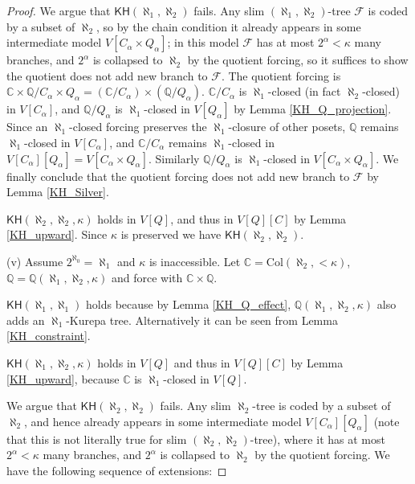 \documentclass[10pt,reqno]{amsart}
\theoremstyle{plain}
\theoremstyle{definition}
\theoremstyle{remark}
\begin{document}
\begin{proof}
We argue that $\mathsf{KH}(\aleph_1,\aleph_2)$ fails. Any slim $(\aleph_1,\aleph_2)$-tree $\mathcal{F}$ is coded by a subset of $\aleph_2$, so by the chain condition it already appears in some intermediate model $V[C_\alpha\times Q_\alpha]$; in this model $\mathcal{F}$ has at most $2^\alpha<\kappa$ many branches, and $2^\alpha$ is collapsed to $\aleph_2$ by the quotient forcing, so it suffices to show the quotient does not add new branch to $\mathcal{F}$. The quotient forcing is $\mathbb{C}\times\mathbb{Q}/C_\alpha\times Q_\alpha=(\mathbb{C}/C_\alpha)\times(\mathbb{Q}/Q_\alpha)$. $\mathbb{C}/C_\alpha$ is $\aleph_1$-closed (in fact $\aleph_2$-closed) in $V[C_\alpha]$, and $\mathbb{Q}/Q_\alpha$ is $\aleph_1$-closed in $V[Q_\alpha]$ by Lemma \ref{KH_Q_projection}. Since an $\aleph_1$-closed forcing preserves the $\aleph_1$-closure of other posets, $\mathbb{Q}$ remains $\aleph_1$-closed in $V[C_\alpha]$, and $\mathbb{C}/C_\alpha$ remains $\aleph_1$-closed in $V[C_\alpha][Q_\alpha]=V[C_\alpha\times Q_\alpha]$. Similarly $\mathbb{Q}/Q_\alpha$ is $\aleph_1$-closed in $V[C_\alpha\times Q_\alpha]$. We finally conclude that the quotient forcing does not add new branch to $\mathcal{F}$ by Lemma \ref{KH_Silver}.

$\mathsf{KH}(\aleph_2,\aleph_2,\kappa)$ holds in $V[Q]$, and thus in $V[Q][C]$ by Lemma \ref{KH_upward}. Since $\kappa$ is preserved we have $\mathsf{KH}(\aleph_2,\aleph_2)$.

(v) Assume $2^{\aleph_0}=\aleph_1$ and $\kappa$ is inaccessible. Let $\mathbb{C}=\mathrm{Col}(\aleph_2,<\kappa)$, $\mathbb{Q}=\mathbb{Q}(\aleph_1,\aleph_2,\kappa)$ and force with $\mathbb{C}\times\mathbb{Q}$. 

$\mathsf{KH}(\aleph_1,\aleph_1)$ holds because by Lemma \ref{KH_Q_effect}, $\mathbb{Q}(\aleph_1,\aleph_2,\kappa)$ also adds an $\aleph_1$-Kurepa tree. Alternatively it can be seen from Lemma \ref{KH_constraint}.

$\mathsf{KH}(\aleph_1,\aleph_2,\kappa)$ holds in $V[Q]$ and thus in $V[Q][C]$ by Lemma \ref{KH_upward}, because $\mathbb{C}$ is $\aleph_1$-closed in $V[Q]$.

We argue that $\mathsf{KH}(\aleph_2,\aleph_2)$ fails. Any slim $\aleph_2$-tree is coded by a subset of $\aleph_2$, and hence already appears in some intermediate model $V[C_\alpha][Q_\alpha]$ (note that this is not literally true for slim $(\aleph_2,\aleph_2)$-tree), where it has at most $2^\alpha<\kappa$ many branches, and $2^\alpha$ is collapsed to $\aleph_2$ by the quotient forcing. We have the following sequence of extensions:


\end{proof}
\end{document}
